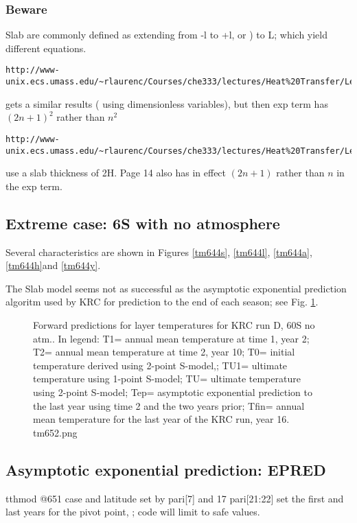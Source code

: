 \subsubsection{Beware}
Slab are commonly defined as extending from -l to +l, or ) to L; which yield different equations. 

\vspace{-3.mm} 
\begin{verbatim}
http://www-unix.ecs.umass.edu/~rlaurenc/Courses/che333/lectures/Heat%20Transfer/Lecture9.pdf 
\end{verbatim} 
 gets a similar results ( using dimensionless variables), but then exp term has $(2n+1)^2$ rather than $n^2$
 
\begin{verbatim}
http://www-unix.ecs.umass.edu/~rlaurenc/Courses/che333/lectures/Heat%20Transfer/Lecture9.pdf
\end{verbatim}
use a slab thickness of 2H. Page 14 also has in effect $(2n+1)$ rather than $n$ in the exp term.


\subsection{Extreme case: 6\qd S with no atmosphere}
 Several characteristics are shown in Figures  \ref{tm644s}, \ref{tm644l}, \ref{tm644a}, \ref{tm644h}and \ref{tm644y}.

The Slab model seems not as successful as the asymptotic exponential prediction
algoritm used by KRC for prediction to the end of each season; see
Fig. \ref{tm652}.
 
\begin{figure}[!ht] 
\caption[Layer predictions]{Forward predictions for layer temperatures for KRC
  run D, 60S no atm.. In legend: T1= annual mean temperature at time 1, year 2;
  T2= annual mean temperature at time 2, year 10; T0= initial temperature
  derived using 2-point S-model,; TU1= ultimate temperature using 1-point
  S-model; TU= ultimate temperature using 2-point S-model; Tep= asymptotic
  exponential prediction to the last year using time 2 and the two years prior;
  Tfin= annual mean temperature for the last year of the KRC run, year 16.
\label{tm652} tm652.png  }
\end{figure} 

\subsection{Asymptotic exponential prediction: EPRED } %

tthmod @651
case and latitude set by pari[7] and 17
pari[21:22] set the first and last years for the pivot point, ; code will limit to safe values.

